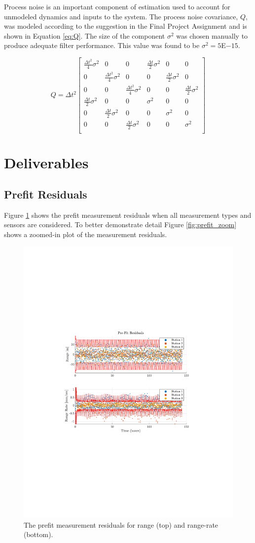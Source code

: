 \documentclass[11pt]{article}
\begin{document}
Process noise is an important component of estimation used to account for unmodeled dynamics and inputs to the system. The process noise covariance, $Q$, was modeled according to the suggestion in the Final Project Assignment and is shown in Equation \eqref{eq:Q}. The size of the component $\sigma^2$ was chosen manually to produce adequate filter performance. This value was found to be $\sigma^2 = 5$E$-15$.

\begin{equation}
\label{eq:Q}
Q = \Delta t^2 \begin{bmatrix}
\frac{\Delta t^2}{4} \sigma^2 & 0 & 0 & \frac{\Delta t}{2} \sigma^2 & 0 & 0 \\
0 & \frac{\Delta t^2}{4} \sigma^2 & 0 & 0 & \frac{\Delta t}{2} \sigma^2 & 0 \\
0 & 0 & \frac{\Delta t^2}{4} \sigma^2 & 0 & 0 & \frac{\Delta t}{2} \sigma^2 \\
\frac{\Delta t}{2} \sigma^2 & 0 & 0 & \sigma^2 & 0 & 0 \\
0 & \frac{\Delta t}{2} \sigma^2 & 0 & 0 & \sigma^2 & 0 \\
0 & 0 & \frac{\Delta t}{2} \sigma^2 & 0 & 0 & \sigma^2 \\	
\end{bmatrix}
\end{equation}

\section{Deliverables}

\subsection{Prefit Residuals}

Figure \ref{fig:prefit} shows the prefit measurement residuals when all measurement types and sensors are considered. To better demonstrate detail Figure \ref{fig:prefit_zoom} shows a zoomed-in plot of the measurement residuals.

\begin{figure}[!htb]
	\centering
	\includegraphics[clip,trim=4cm 8.5cm 4cm 8.5cm, width=.5\textwidth]{figs/prefit_res_final.pdf}
	\caption{The prefit measurement residuals for range (top) and range-rate (bottom).}
	\label{fig:prefit}
\end{figure}
\end{document}

